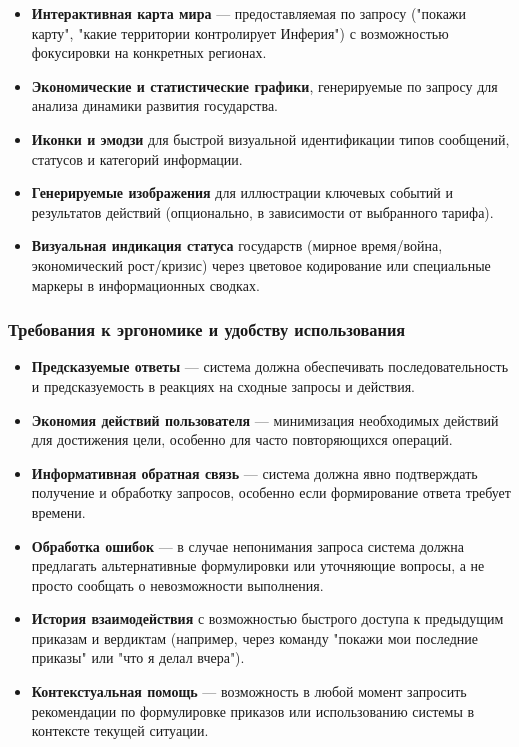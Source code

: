 \begin{itemize}
    \item \textbf{Интерактивная карта мира} — предоставляемая по запросу ("{}покажи карту"{}, "{}какие территории контролирует Инферия"{}) с возможностью фокусировки на конкретных регионах.

    \item \textbf{Экономические и статистические графики}, генерируемые по запросу для анализа динамики развития государства.

    \item \textbf{Иконки и эмодзи} для быстрой визуальной идентификации типов сообщений, статусов и категорий информации.

    \item \textbf{Генерируемые изображения} для иллюстрации ключевых событий и результатов действий (опционально, в зависимости от выбранного тарифа).

    \item \textbf{Визуальная индикация статуса} государств (мирное время/война, экономический рост/кризис) через цветовое кодирование или специальные маркеры в информационных сводках.
\end{itemize}

\subsubsection{Требования к эргономике и удобству использования}

\begin{itemize}
    \item \textbf{Предсказуемые ответы} — система должна обеспечивать последовательность и предсказуемость в реакциях на сходные запросы и действия.

    \item \textbf{Экономия действий пользователя} — минимизация необходимых действий для достижения цели, особенно для часто повторяющихся операций.

    \item \textbf{Информативная обратная связь} — система должна явно подтверждать получение и обработку запросов, особенно если формирование ответа требует времени.

    \item \textbf{Обработка ошибок} — в случае непонимания запроса система должна предлагать альтернативные формулировки или уточняющие вопросы, а не просто сообщать о невозможности выполнения.

    \item \textbf{История взаимодействия} с возможностью быстрого доступа к предыдущим приказам и вердиктам (например, через команду "{}покажи мои последние приказы"{} или "{}что я делал вчера"{}).

    \item \textbf{Контекстуальная помощь} — возможность в любой момент запросить рекомендации по формулировке приказов или использованию системы в контексте текущей ситуации.
\end{itemize}


